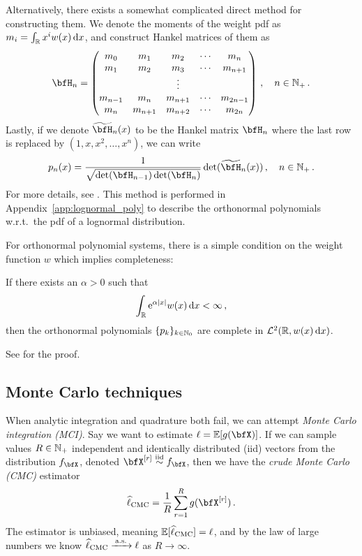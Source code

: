 Alternatively, there exists a somewhat complicated direct method for constructing them. We denote the moments of the weight pdf as $m_i = \int_{\mathbb{R}} x^i w(x) \mathop{}\!\mathrm{d} x$, and construct Hankel matrices of them as
\[ \bfH_n = \begin{pmatrix}
m_0 & m_1 &  m_2 &\cdots & m_n \\
m_1 & m_2 &  m_3 &\cdots & m_{n+1} \\
&&\vdots&& \\
m_{n-1} &m_n& m_{n+1} &\cdots &m_{2n-1}\\
m_n &m_{n+1}& m_{n+2} &\cdots &m_{2n}
\end{pmatrix} \,, \quad n \in \NL \,. \]
Lastly, if we denote $\tilde{\bfH}_n(x)$ to be the Hankel matrix $\bfH_n$ where the last row is replaced by $(1, x, x^2, \dots, x^n)$, we can write
\begin{equation} \label{ortho_poly_gen_form}
p_n(x) = \frac{1}{\sqrt{ \det( \bfH_{n-1} ) \det( \bfH_n ) }} \det( \tilde{\bfH}_n(x) ) \,, \quad n \in \NL \,.
\end{equation}
For more details, see \cite[pp.\ 26--27]{Szegoe1939}.
This method is performed in Appendix~\ref{app:lognormal_poly} to describe the orthonormal polynomials w.r.t.\ the pdf of a lognormal distribution.


For orthonormal polynomial systems, there is a simple condition on the weight function $w$ which implies completeness:
\begin{proposition} \label{prop:complete_polynomials}
If there exists an $\alpha>0$ such that
\begin{equation*}
\int_{\mathbb{R}} \mathrm{e}^{\alpha|x|} w(x) \mathop{}\!\mathrm{d} x < \infty\,,
\end{equation*}
then the orthonormal polynomials $\{ p_k \}_{k\in\mathbb{N}_0}$ are complete in $\mathcal{L}^2(\mathbb{R}, w(x) \mathop{}\!\mathrm{d} x)$.
\end{proposition}

See \cite[p.\ 333]{Na65} for the proof.


\subsection{Monte Carlo techniques} \label{sec:monte_carlo_integration}

When analytic integration and quadrature both fail, we can attempt \emph{Monte Carlo integration (MCI)}. Say we want to estimate $\ell = \Exp[ g(\bfX) ]$. If we can sample values $R \in \mathbb{N}_+$ independent and identically distributed (iid) vectors from the distribution $f_{\bfX}$, denoted $\bfX^{[r]} \iidDist f_{\bfX}$, then we have the \emph{crude Monte Carlo (CMC)} estimator
\begin{equation} \label{basic_mci}
\hat{\ell}_{\mathrm{CMC}} = \frac1R \sum_{r=1}^R g(\bfX^{[r]}) \,.
\end{equation}
The estimator is unbiased, meaning $\operatorname{{\mathbb E}}[ \widehat{\ell}_{\mathrm{CMC}} ] = \ell$, and by the law of large numbers we know $\widehat{\ell}_{\mathrm{CMC}} \xrightarrow{\:\smash{\mathrm{a.s.}}\:} \ell$ as $R \to \infty$.

